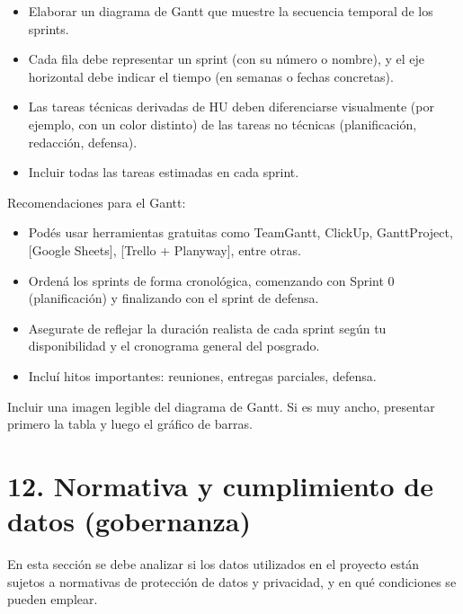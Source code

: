 \documentclass[
11pt, %
]{charter}
\begin{document}
\begin{itemize}

\item Elaborar un diagrama de Gantt que muestre la secuencia temporal de los sprints.

\item Cada fila debe representar un sprint (con su número o nombre), y el eje horizontal debe indicar el tiempo (en semanas o fechas concretas).

\item Las tareas técnicas derivadas de HU deben diferenciarse visualmente (por ejemplo, con un color distinto) de las tareas no técnicas (planificación, redacción, defensa).

\item Incluir todas las tareas estimadas en cada sprint.
\end{itemize}

Recomendaciones para el Gantt:

\begin{itemize}

	\item Podés usar herramientas gratuitas como TeamGantt, ClickUp, GanttProject, [Google Sheets], [Trello + Planyway], entre otras.
	\item Ordená los sprints de forma cronológica, comenzando con Sprint 0 (planificación) y finalizando con el sprint de defensa.
	\item Asegurate de reflejar la duración realista de cada sprint según tu disponibilidad y el cronograma general del posgrado.
	\item Incluí hitos importantes: reuniones, entregas parciales, defensa.
\end{itemize}


Incluir una imagen legible del diagrama de Gantt. Si es muy ancho, presentar primero la tabla y luego el gráfico de barras.



\section{12. Normativa y cumplimiento de datos (gobernanza)}

En esta sección se debe analizar si los datos utilizados en el proyecto están sujetos a normativas de protección de datos y privacidad, y en qué condiciones se pueden emplear.
\end{document}
